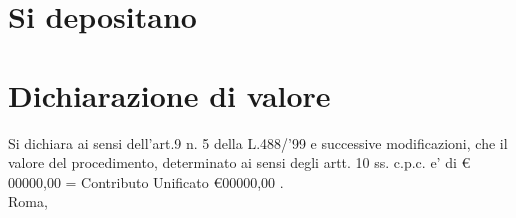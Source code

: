 \documentclass [12pt]{article}
\begin{document}
\section{Si depositano}\label{documenti} 
\section{Dichiarazione di valore}\label{dichiarazione di valore}
Si dichiara ai sensi dell'art.9 n. 5 della L.488/'99 e successive modificazioni, che il valore del procedimento, determinato ai sensi degli artt. 10 ss. c.p.c. e' di € 00000,00 = Contributo Unificato                 \euro 00000,00 .\\
Roma, \makeatletter
\@date
\begin{flushright}
\makeatletter
\@author
\end{flushright}
\end{document}
